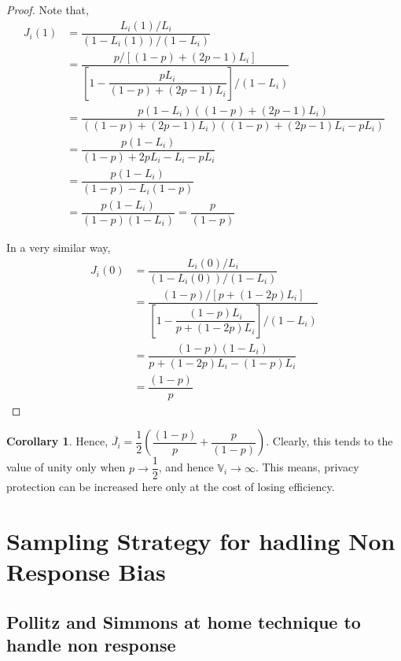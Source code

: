 \documentclass[12pt]{article}
\newcommand{\Var}{\mathbb{V}}
\theoremstyle{definition}
\newtheorem{cor}{Corollary}
\newenvironment{corollary}{
\begin{tcolorbox}[colback=blue!5!white,colframe=blue!75!black, parbox = false]\begin{cor} }{\end{cor}\end{tcolorbox} }
\begin{document}
\begin{proof}
    Note that,
    \begin{align*}
        J_i(1)
        & = \dfrac{L_i(1)/L_i}{(1 - L_i(1)) / (1 - L_i)}\\
        & = \dfrac{p / \left[ (1-p) + (2p-1)L_i \right]}{ \left[ 1 - \dfrac{pL_i}{(1-p) + (2p-1)L_i}\right] / (1 - L_i)}\\
        & = \dfrac{p(1-L_i) \left( (1-p) + (2p-1)L_i \right) }{ \left( (1-p) + (2p-1)L_i \right) \left( (1-p) + (2p-1)L_i - pL_i \right) }\\
        & = \dfrac{p(1- L_i)}{ (1-p) + 2pL_i - L_i - pL_i }\\
        & = \dfrac{p(1- L_i)}{ (1-p) - L_i(1-p) }\\
        & = \dfrac{p (1- L_i)}{(1 - p) (1 - L_i)} = \dfrac{p}{(1-p)}
    \end{align*}

    In a very similar way,
    \begin{align*}
        J_i(0)
        & = \dfrac{L_i(0)/L_i}{(1 - L_i(0)) / (1 - L_i)}\\
        & = \dfrac{(1-p) / \left[ p + (1 - 2p)L_i \right]}{ \left[ 1 - \dfrac{(1-p)L_i}{p + (1 - 2p)L_i}\right] / (1 - L_i)}\\
        & = \dfrac{(1-p)(1-L_i)}{p + (1-2p)L_i - (1-p)L_i}\\
        & = \dfrac{(1-p)}{p}
    \end{align*}
\end{proof}

\begin{corollary}
    Hence, $\overline{J_i} = \dfrac{1}{2}\left( \dfrac{(1-p)}{p} + \dfrac{p}{(1-p)} \right)$. Clearly, this tends to the value of unity only when $p \rightarrow \dfrac{1}{2}$, and hence $\Var_i \rightarrow \infty$. This means, privacy protection can be increased here only at the cost of losing efficiency.
\end{corollary}





\section{Sampling Strategy for hadling Non Response Bias}

\subsection{Pollitz and Simmons at home technique to handle non response}
\end{document}
